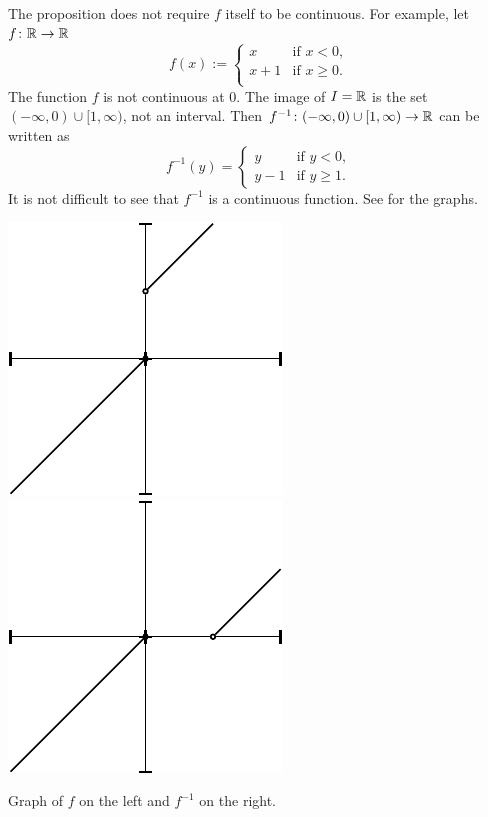 \begin{example}
The proposition does not require $f$ itself to be continuous.  For example, let
$f \colon {\mathbb{R}} \to {\mathbb{R}}$
\begin{equation*}
f(x) :=
\begin{cases}
x & \text{if $x < 0$}, \\
x+1 & \text{if $x \geq 0$}. \\
\end{cases}
\end{equation*}
The function $f$ is not continuous at $0$.
The image of $I = {\mathbb{R}}$ is the set 
$(-\infty,0)\cup [1,\infty)$, not an interval.
Then $f^{-1} \colon (-\infty,0)\cup [1,\infty)
\to {\mathbb{R}}$ can be written as
\begin{equation*}
f^{-1}(y) =
\begin{cases}
y & \text{if $y < 0$}, \\
y-1 & \text{if $y \geq 1$}. 
\end{cases}
\end{equation*}
It is not difficult to see that $f^{-1}$ is a continuous function.  See
 for the graphs.
\begin{myfigureht}
\hspace{\fill}
\includegraphics{figures/invcontfigA}
\hspace{\fill}
\includegraphics{figures/invcontfigB}
\hspace{\fill}
\caption{Graph of $f$ on the left and $f^{-1}$ on the right.\label{invcontfig}}
\end{myfigureht}
\end{example}

